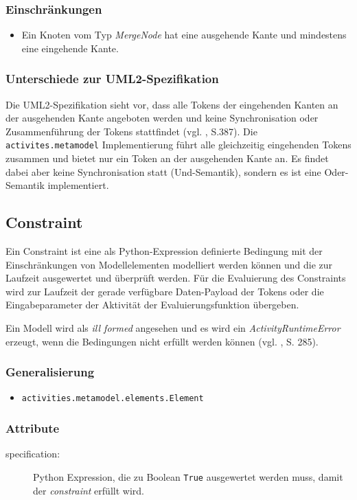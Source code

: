 \subsubsection{Einschränkungen}
\begin{itemize}
\item Ein Knoten vom Typ \emph{MergeNode} hat eine ausgehende Kante und mindestens eine eingehende Kante.
\end{itemize}

\subsubsection{Unterschiede zur UML2-Spezifikation}
Die UML2-Spezifikation sieht vor, dass alle Tokens der eingehenden Kanten an der ausgehenden Kante angeboten werden und keine Synchronisation oder Zusammenführung der Tokens stattfindet (vgl. \citep{OMG2009}, S.387). Die \texttt{activites.metamodel} Implementierung führt alle gleichzeitig eingehenden Tokens zusammen und bietet nur ein Token an der ausgehenden Kante an. Es findet dabei aber keine Synchronisation statt (Und-Semantik), sondern es ist eine Oder-Semantik implementiert.


\subsection{Constraint}\label{amrep-meta-constraint}
Ein Constraint ist eine als Python-Expression definierte Bedingung mit der Einschränkungen von Modellelementen modelliert werden können und die zur Laufzeit ausgewertet und überprüft werden. Für die Evaluierung des Constraints wird zur Laufzeit der gerade verfügbare Daten-Payload der Tokens oder die Eingabeparameter der Aktivität der Evaluierungsfunktion übergeben.

Ein Modell wird als \emph{ill formed} angesehen und es wird ein \emph{ActivityRuntimeError} erzeugt, wenn die Bedingungen nicht erfüllt werden können (vgl. \citep{RumbaughJacobsonBooch2005}, S. 285).

\subsubsection{Generalisierung}
\begin{itemize}
\item \texttt{activities.metamodel.elements.Element}
\end{itemize}

\subsubsection{Attribute}
\begin{description}
\item[specification:] Python Expression, die zu Boolean \texttt{True} ausgewertet werden muss, damit der \emph{constraint} erfüllt wird.
\end{description}

